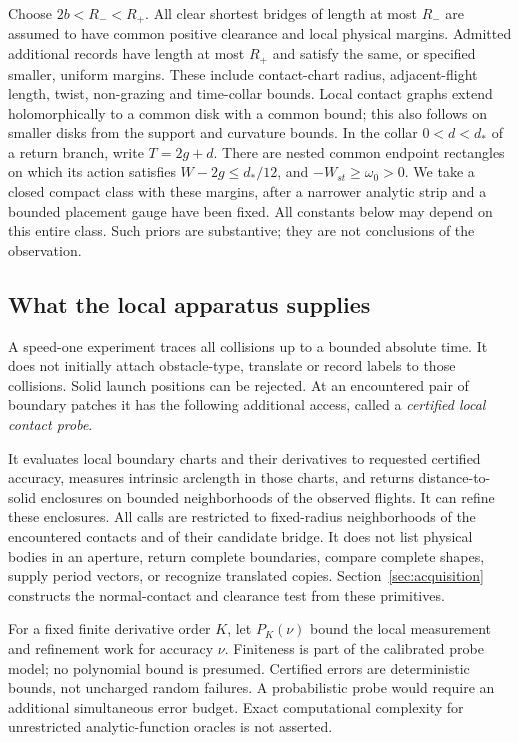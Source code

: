 Choose $2b<R_-<R_+$. All clear shortest bridges of length at most $R_-$
are assumed to have common positive clearance and local physical margins.
Admitted additional records have length at most $R_+$ and satisfy the
same, or specified smaller, uniform margins. These include contact-chart
radius, adjacent-flight length, twist, non-grazing and time-collar bounds.
Local contact graphs extend holomorphically to a common disk with a common
bound; this also follows on smaller disks from the support and curvature
bounds. In the collar $0<d<d_*$ of a return branch, write $T=2g+d$.
There are nested common endpoint rectangles on which its action satisfies
$W-2g\le d_*/12$, and $-W_{st}\ge\omega_0>0$.
We take a closed compact class with these margins, after a narrower
analytic strip and a bounded placement gauge have been fixed. All constants
below may depend on this entire class. Such priors are substantive; they
are not conclusions of the observation.

\subsection{What the local apparatus supplies}
A speed-one experiment traces all collisions up to a bounded absolute
time. It does not initially attach obstacle-type, translate or record
labels to those collisions. Solid launch positions can be rejected. At
an encountered pair of boundary patches it has the following additional
access, called a \emph{certified local contact probe}.

It evaluates local boundary charts and their derivatives to requested
certified accuracy, measures intrinsic arclength in those charts, and
returns distance-to-solid enclosures on bounded neighborhoods of the
observed flights. It can refine these enclosures. All calls are restricted
to fixed-radius neighborhoods of the encountered contacts and of their
candidate bridge. It does not list physical bodies in an aperture, return
complete boundaries, compare complete shapes, supply period vectors, or
recognize translated copies. Section~\ref{sec:acquisition} constructs the
normal-contact and clearance test from these primitives.

For a fixed finite derivative order $K$, let $P_K(\nu)$ bound the
local measurement and refinement work for accuracy $\nu$. Finiteness
is part of the calibrated probe model; no polynomial bound is presumed.
Certified errors are deterministic bounds, not uncharged random failures.
A probabilistic probe would require an additional simultaneous error
budget. Exact computational complexity for unrestricted analytic-function
oracles is not asserted.

